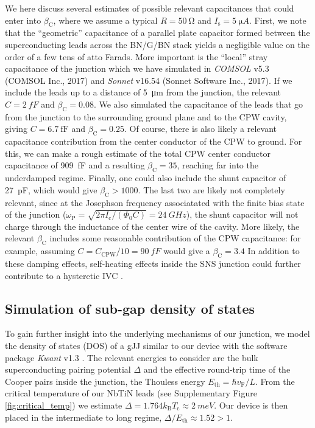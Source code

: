 We here discuss several estimates of possible relevant capacitances that could enter into $\beta_\text{C}$, where we assume a typical $R=\SI{50}{\ohm}$ and $I_\text{s}=\SI{5}{\micro A}$.
First, we note that the ``geometric'' capacitance of a parallel plate capacitor formed between the superconducting leads across the BN/G/BN stack yields a negligible value on the order of a few tens of atto Farads.
More important is the ``local'' stray capacitance of the junction which we have simulated in \textit{COMSOL} v5.3 (COMSOL Inc., 2017) and \textit{Sonnet} v16.54 (Sonnet Software Inc., 2017).
If we include the leads up to a distance of \SI{5}{\micro m} from the junction, the relevant $C=\SI{2}{fF}$ and $\beta_\text{C}=0.08$.
We also simulated the capacitance of the leads that go from the junction to the surrounding ground plane and to the CPW cavity, giving $C=\SI{6.7}{\femto\farad}$ and $\beta_\text{C}=0.25$.
Of course, there is also likely a relevant capacitance contribution from the center conductor of the CPW to ground.
For this, we can make a rough estimate of the total CPW center conductor capacitance of \SI{909}{fF} and a resulting $\beta_\text{C}=35$, reaching far into the underdamped regime.
Finally, one could also include the shunt capacitor of \SI{27}{pF}, which would give $\beta_\text{C}>1000$. 
The last two are likely not completely relevant, since at the Josephson frequency associatated with the finite bias state of the junction ($\omega_\text{P}=\sqrt{2\pi I_\text{c}/(\Phi_0 C)}=\SI{24}{GHz}$), the shunt capacitor will not charge through the inductance of the center wire of the cavity. 
More likely, the relevant $\beta_\text{C}$ includes some reasonable contribution of the CPW capacitance: for example, assuming $C = C_\text{CPW} / 10 = \SI{90}{fF}$ would give a $\beta_\text{C} = 3.4$
In addition to these damping effects, self-heating effects inside the SNS junction could further contribute to a hysteretic IVC \cite{courtois_origin_2008,borzenets_phonon_2013}.




\subsection{Simulation of sub-gap density of states}\label{sec:subgap}
\noindent To gain further insight into the underlying mechanisms of our junction, we model the density of states (DOS) of a gJJ similar to our device with the software package \textit{Kwant} v1.3 \cite{groth_kwant_2014}.
The relevant energies to consider are the bulk superconducting pairing potential $\Delta$ and the effective round-trip time of the Cooper pairs inside the junction, the Thouless energy $E_\text{th}=\hbar v_\text{F}/L$.
From the critical temperature of our NbTiN leads (see Supplementary Figure \ref{fig:critical_temp}) we estimate\cite{tinkham_introduction_1996} $\Delta=1.764k_\text{B} T_\text{c}\approx\SI{2}{meV}$.
Our device is then placed in the intermediate to long regime, $\Delta/E_\text{th}\approx1.52>1$.

